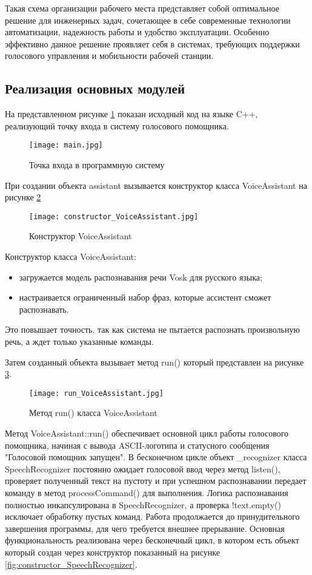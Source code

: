 Такая схема организации рабочего места представляет собой оптимальное решение для инженерных задач, сочетающее в себе современные технологии автоматизации, надежность работы и удобство эксплуатации. Особенно эффективно данное решение проявляет себя в системах, требующих поддержки голосового управления и мобильности рабочей станции.

\subsection{Реализация основных модулей}

На представленном рисунке \ref{fig:main.cpp} показан исходный код на языке C++, реализующий точку входа в систему голосового помощника.
\begin{figure}[H]
	\centering
	\texttt{[image: main.jpg]}
	\caption{Точка входа в программную систему}
	\label{fig:main.cpp}
\end{figure}

При создании объекта assistant вызывается конструктор класса VoiceAssistant на рисунке \ref{fig:constructor_VoiceAssistant}

\begin{figure}[H]
	\centering
	\texttt{[image: constructor\_VoiceAssistant.jpg]}
	\caption{Конструктор VoiceAssistant}
	\label{fig:constructor_VoiceAssistant}
\end{figure}

Конструктор класса VoiceAssistant:
\begin{itemize}
 	\item загружается модель распознавания речи Vosk для русского языка;
	\item настраивается ограниченный набор фраз, которые ассистент сможет распознавать.
\end{itemize}

Это повышает точность, так как система не пытается распознать произвольную речь, а ждет только указанные команды.

Затем созданный объекта вызывает метод run() который представлен на рисунке \ref{fig:run_VoiceAssistant}.

\begin{figure}[H]
	\centering
	\texttt{[image: run\_VoiceAssistant.jpg]}
	\caption{Метод run() класса VoiceAssistant}
	\label{fig:run_VoiceAssistant}
\end{figure}

Метод VoiceAssistant::run() обеспечивает основной цикл работы голосового помощника, начиная с вывода ASCII-логотипа и статусного сообщения "Голосовой помощник запущен". В бесконечном цикле объект \_recognizer класса SpeechRecognizer постоянно ожидает голосовой ввод через метод listen(), проверяет полученный текст на пустоту и при успешном распознавании передает команду в метод processCommand() для выполнения. Логика распознавания полностью инкапсулирована в SpeechRecognizer, а проверка !text.empty() исключает обработку пустых команд. Работа продолжается до принудительного завершения программы, для чего требуется внешнее прерывание. Основная функциональность реализована через бесконечный цикл, в котором есть объект который создан через конструктор показанный на рисунке \ref{fig:constructor_SpeechRecognizer}.

